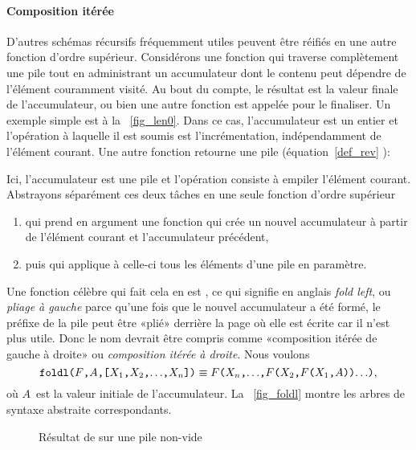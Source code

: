 \paragraph{Composition itérée}
\label{par_folds}

D'autres schémas récursifs fréquemment utiles peuvent être réifiés en
une autre fonction d'ordre supérieur. Considérons une fonction qui
traverse complètement une pile tout en administrant un accumulateur
dont le contenu peut dépendre de l'élément couramment visité. Au bout
du compte, le résultat est la valeur finale de l'accumulateur, ou bien
une autre fonction est appelée pour le finaliser. Un exemple simple
est  à la \fig~\vref{fig_len0}. Dans ce cas,
l'accumulateur est un entier et l'opération à laquelle il est soumis
est l'incrémentation, indépendamment de l'élément courant. Une autre
fonction retourne une pile (équation~\eqref{def_rev}
):
 
Ici, l'accumulateur est une pile et l'opération consiste à empiler
l'élément courant. Abstrayons séparément ces deux tâches en une seule
fonction d'ordre supérieur
\begin{enumerate}

  \item qui prend en argument une fonction qui crée un nouvel
  accumulateur à partir de l'élément courant et l'accumulateur
  précédent,

  \item puis qui applique à celle-ci tous les éléments d'une pile en
  paramètre.

\end{enumerate}
Une fonction célèbre qui fait cela en \Erlang est ,
ce qui signifie en anglais \emph{fold left}, ou \emph{pliage à gauche}
parce qu'une fois que le nouvel accumulateur a été formé, le préfixe
de la pile peut être «plié» derrière la page où elle est écrite car il
n'est plus utile. Donc le nom devrait être compris comme «composition
itérée de gauche à droite» ou \emph{composition itérée à droite}. Nous
voulons
\begin{equation*}
\texttt{foldl(\(F\),\(A\),[\(X_1\),\(X_2\),\(\ldots\),\(X_{n}\)])}
\equiv
\texttt{\(F\)(\(X_{n}\),\(\ldots\),\(F\)(\(X_2\),\(F\)(\(X_1\),\(A\)))\(\ldots\))},
\end{equation*}
où \(A\)~est la valeur initiale de l'accumulateur. La
\fig~\vref{fig_foldl} montre les arbres de syntaxe abstraite
correspondants.
\begin{figure}
\centering
{}
\qquad
{}
\caption{Résultat de  sur une pile non-vide
\label{fig_foldl}}
\end{figure}
